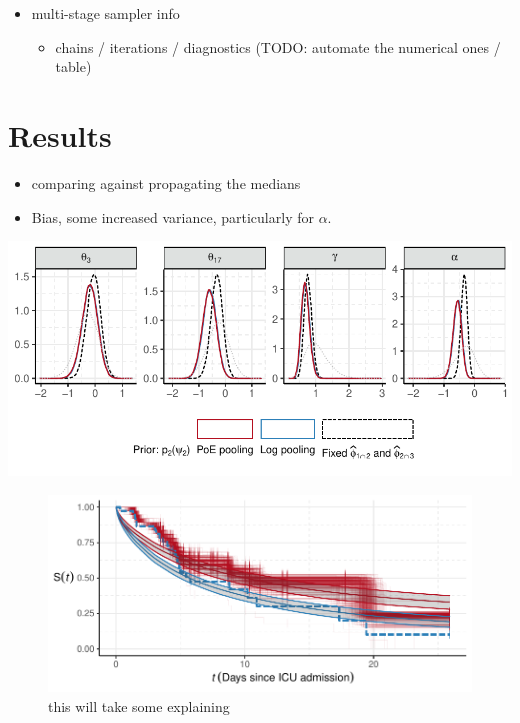 \documentclass[
  10pt,
  a4paper,
]{article}
\providecommand{\tightlist}{%
  \setlength{\itemsep}{0pt}\setlength{\parskip}{0pt}}
\begin{document}
\begin{itemize}
\tightlist
\item
  multi-stage sampler info

  \begin{itemize}
  \tightlist
  \item
    chains / iterations / diagnostics (TODO: automate the numerical ones
    / table)
  \end{itemize}
\end{itemize}

\hypertarget{results}{%
\section{Results}\label{results}}

\begin{itemize}
\tightlist
\item
  comparing against propagating the medians
\item
  Bias, some increased variance, particularly for \(\alpha\).
\end{itemize}

\begin{center}\includegraphics{../plots/mimic-example/psi-2-method-comparison-small} \end{center}

\begin{figure}

{\centering \includegraphics{../plots/mimic-example/kaplan-meier-pc} 

}

\caption{this will take some explaining}\label{fig:kap_meier_pc_plot}
\end{figure}
\end{document}
